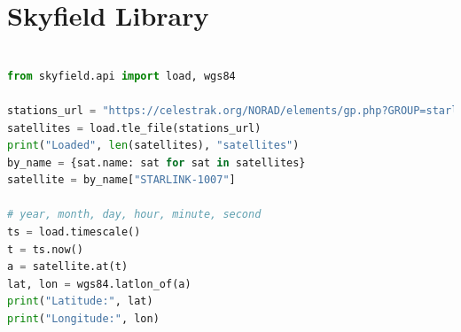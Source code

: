 \documentclass[IN,11pt,twoside,openright,idp,english]{tumthesis}
\begin{document}
\chapter{Skyfield Library}
\label{app:sky}

\begin{lstlisting}[language=python,caption={retrieving a Satellite's position using the Satname},captionpos=b]

from skyfield.api import load, wgs84

stations_url = "https://celestrak.org/NORAD/elements/gp.php?GROUP=starlink&FORMAT=tle"
satellites = load.tle_file(stations_url)
print("Loaded", len(satellites), "satellites")
by_name = {sat.name: sat for sat in satellites}
satellite = by_name["STARLINK-1007"]

# year, month, day, hour, minute, second
ts = load.timescale()
t = ts.now()
a = satellite.at(t)
lat, lon = wgs84.latlon_of(a)
print("Latitude:", lat)
print("Longitude:", lon)
\end{lstlisting}

\clearpage
\pagestyle{thesischapter}
\cleardoublepage
{}
\printbibliography[heading=bibintoc]
\clearpage
\pagestyle{empty}
\end{document}
